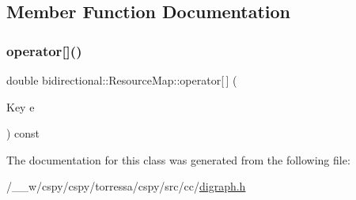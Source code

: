 \subsection{Member Function Documentation}
\mbox{\label{classbidirectional_1_1ResourceMap_a0da7ed255fdf2bbc1a7bfc190c828bc4}} 
\subsubsection{\texorpdfstring{operator[]()}{operator[]()}}
{\footnotesize\ttfamily double bidirectional\+::\+Resource\+Map\+::operator\mbox{[}$\,$\mbox{]} (\begin{DoxyParamCaption}\item[{Key}]{e }\end{DoxyParamCaption}) const\hspace{0.3cm}{\ttfamily [inline]}}



The documentation for this class was generated from the following file\+:\begin{DoxyCompactItemize}
\item 
/\+\_\+\+\_\+w/cspy/cspy/torressa/cspy/src/cc/\hyperlink{digraph_8h}{digraph.\+h}\end{DoxyCompactItemize}
